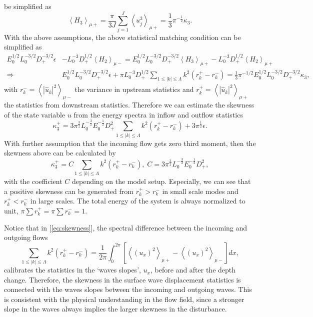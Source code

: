 \documentclass[9pt,twoside,lineno]{pnas-new}
\theoremstyle{plain}
\theoremstyle{plain}
\begin{document}
be simplified as
\[
\left\langle H_{3}\right\rangle _{\mu+}=\frac{\pi}{3J}\sum_{j=1}^{J}\left\langle u_{j}^{3}\right\rangle _{\mu+}=\frac{1}{3}\pi^{-\frac{1}{2}}\kappa_{3}.
\]
With the above assumptions, the above statistical matching condition
can be simplified as
\begin{align*}
E_{0}^{1/2}L_{0}^{-3/2}D_{+}^{-3/2}\epsilon & -L_{0}^{-3}D_{+}^{1/2}\left\langle H_{2}\right\rangle _{\mu-}=E_{0}^{1/2}L_{0}^{-3/2}D_{+}^{-3/2}\left\langle H_{3}\right\rangle _{\mu+}-L_{0}^{-3}D_{+}^{1/2}\left\langle H_{2}\right\rangle _{\mu+}\\
\Rightarrow\; & E_{0}^{1/2}L_{0}^{-3/2}D_{+}^{-3/2}\epsilon+\pi L_{0}^{-3}D_{+}^{1/2}\sum_{1\leq\left|k\right|\leq\Lambda}k^{2}\left(r_{k}^{+}-r_{k}^{-}\right)=\frac{1}{3}\pi^{-1/2}E_{0}^{1/2}L_{0}^{-3/2}D_{+}^{-3/2}\kappa_{3},
\end{align*}
with $r_{k}^{-}=\left\langle \left|\hat{u}_{k}\right|^{2}\right\rangle _{\mu-}$
the variance in upstream statistics and $r_{k}^{+}=\left\langle \left|\hat{u}_{k}\right|^{2}\right\rangle _{\mu+}$
the statistics from downstream statistics. Therefore we can estimate
the skewness of the state variable $u$ from the energy spectra in
inflow and outflow statistics
\begin{equation}
\kappa_{3}^{+}=3\pi^{\frac{3}{2}}L_{0}^{-\frac{3}{2}}E_{0}^{-\frac{1}{2}}D_{+}^{2}\sum_{1\leq\left|k\right|\leq\Lambda}k^{2}\left(r_{k}^{+}-r_{k}^{-}\right)+3\pi^{\frac{1}{2}}\epsilon.\label{eq:skewness}
\end{equation}
With further assumption that the incoming flow gets zero third moment,
then the skewness above can be calculated by
\[
\kappa_{3}^{+}=C\sum_{1\leq\left|k\right|\leq\Lambda}k^{2}\left(r_{k}^{+}-r_{k}^{-}\right),\;C=3\pi^{\frac{3}{2}}L_{0}^{-\frac{3}{2}}E_{0}^{-\frac{1}{2}}D_{+}^{2},
\]
with the coefficient $C$ depending on the model setup. Especially,
we can see that a positive skewness can be generated from $r_{k}^{+}>r_{k}^{-}$
in small scale modes and $r_{k}^{+}<r_{k}^{-}$ in large scales. The
total energy of the system is always normalized to unit, $\pi\sum r_{k}^{+}=\pi\sum r_{k}^{-}=1$. 

Notice that in [\ref{eq:skewness}], the spectral difference between
the incoming and outgoing flows
\[
\sum_{1\leq\left|k\right|\leq\Lambda}k^{2}\left(r_{k}^{+}-r_{k}^{-}\right)=\frac{1}{2\pi}\int_{0}^{2\pi}\left[\left\langle \left(u_{x}\right)^{2}\right\rangle _{\mu+}-\left\langle \left(u_{x}\right)^{2}\right\rangle _{\mu-}\right]dx,
\]
calibrates the statistics in the `waves slopes', $u_{x}$, before
and after the depth change. Therefore, the skewness in the surface
wave displacement statistics is connected with the waves slopes between
the incoming and outgoing waves. This is consistent with the physical
understanding in the flow field, since a stronger slope in the waves
always implies the larger skewness in the disturbance.
\end{document}
